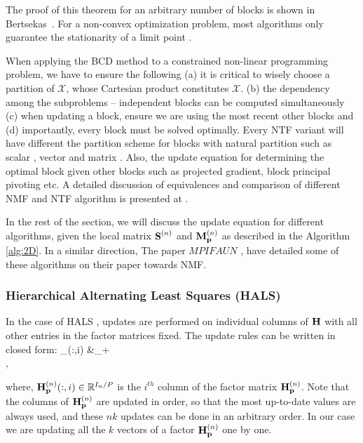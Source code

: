 The proof of this theorem for an arbitrary number of blocks is shown
in Bertsekas~\cite{Bertsekas1999}.
For a non-convex optimization problem, most algorithms only guarantee
the stationarity of a limit point \cite{Lin2007}.

When applying the BCD method to a constrained non-linear programming
problem, we have to ensure the following (a) it is critical to wisely choose a partition of
$\mathcal{X}$, whose Cartesian product constitutes $\mathcal{X}$. 
(b)  the dependency among the subproblems -- independent blocks can be 
computed simultaneously  (c) when updating a block, ensure we are 
using the most recent other blocks and (d) importantly, every block
must be solved optimally. Every NTF variant will have different the partition
scheme for blocks with natural partition such as scalar \cite{SL2001}, vector \cite{CP2009} and matrix \cite{KP2011}. 
Also, the update equation for determining the optimal block given
other blocks such as projected gradient, block principal pivoting \cite{KP2011}  etc. 
A detailed discussion of equivalences and comparison of different NMF and NTF algorithm
is presented at \cite{KHP2014}. 

In the rest of the section, we will discuss the update equation for different 
algorithms, given the local matrix $\Mn{S}{n}$ and $\Mn{M}{n}_{\V{p}}$ as described in the
Algorithm \ref{alg:2D}. In a similar direction, The paper $MPIFAUN$ \cite{KBP2018}, have detailed some of 
these algorithms on their paper towards NMF.

\subsubsection{Hierarchical Alternating Least Squares (HALS)}
\label{sec:HALS}

In the case of HALS \cite{CP2009}, updates are performed on individual columns of $\mathbf{H}$ with all other entries in the factor matrices fixed.
The update rules \cite[Algorithm 2]{CP2009} can be written in closed form:
\SplitN{\label{eqn:halsupdate}} {
_{}(:,i) &\leftarrow \lt[ \Mn{H}{n}_{\V{p}}(:,i) + \Mn{M}{n}_{\V{p}}(:,i) - (\Mn{H}{n}_{\V{p}} \Mn{S}{n})(:,i)  \rt]_+\\
}, 

where, $\Mn{H}{n}_{\V{p}}(:,i) \in \Rn{I_n/P}$ is the $i^{th}$ column of the factor matrix $\Mn{H}{n}_{\V{p}}$.
Note that the columns of $\Mn{H}{n}_{\V{p}}$ are updated in order, so that the most up-to-date values are always used, and these $nk$ updates can be done in an arbitrary order.  In our case we are updating all the $k$ vectors of a factor $\Mn{H}{n}_{\V{p}}$ one by one. 

